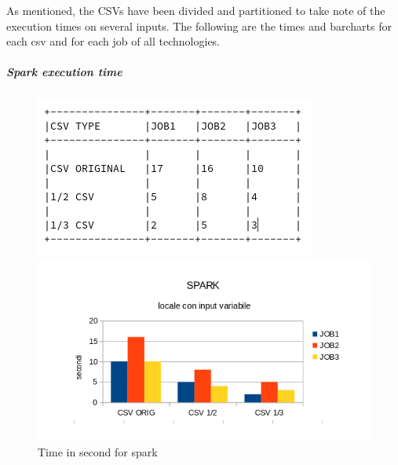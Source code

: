 \documentclass[]{report}
\begin{document}
As mentioned, the CSVs have been divided and partitioned to take note of the execution times on several inputs.
The following are the times and barcharts for each csv and for each job of all technologies.\\
\newpage
\subparagraph*{Spark execution time}
\begin{center}
	\begin{figure}[!htb]
		\begin{minipage}[c]{.40\textwidth}
			\vspace{2 cm}
			\includegraphics[width=1.2 \linewidth]{figure/sparktime}
			\caption{Time in second for spark}
		\end{minipage}
		\begin{minipage}{.40\textwidth}
			\includegraphics[width=2.3 \linewidth]{figure/sparkchart}
		\end{minipage}
	\end{figure}
\end{center}
\end{document}
